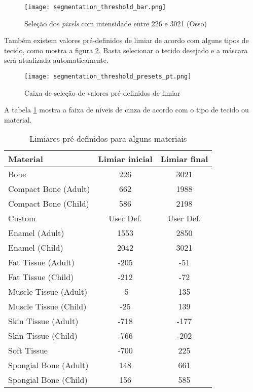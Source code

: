 \begin{figure}[!htb]
\centering
\texttt{[image: segmentation\_threshold\_bar.png]}
\caption{Seleção dos \textit{pixels} com intensidade entre 226 e 3021 (Osso)}
\label{fig:region_selection_bar}
\end{figure}

Também existem valores pré-definidos de limiar de acordo com alguns tipos de tecido, como mostra a
figura \ref{fig:limiar_presets}. Basta selecionar o tecido desejado e a máscara será atualizada
automaticamente.

\begin{figure}[!htb]
\centering
\texttt{[image: segmentation\_threshold\_presets\_pt.png]}
\caption{Caixa de seleção de valores pré-definidos de limiar}
\label{fig:limiar_presets}
\end{figure}

A tabela \ref{tab:limiar} mostra a faixa de níveis de cinza de acordo com o tipo de tecido ou material.

\begin{table}[h]
\centering
\caption{Limiares pré-definidos para alguns materiais}
\begin{tabular}{lcc}\\
\hline %
Material & Limiar inicial & Limiar final\\
\hline
\hline
Bone & 226 & 3021\\
Compact Bone (Adult) & 662 & 1988\\
Compact Bone (Child) & 586 & 2198\\
Custom & User Def. & User Def.\\
Enamel (Adult) & 1553 & 2850\\
Enamel (Child) & 2042 & 3021\\
Fat Tissue (Adult) & -205 & -51\\
Fat Tissue (Child) & -212 & -72\\
Muscle Tissue (Adult) & -5 & 135\\
Muscle Tissue (Child) & -25 & 139\\
Skin Tissue (Adult) & -718 & -177\\
Skin Tissue (Child) & -766 & -202\\
Soft Tissue & -700 & 225\\
Spongial Bone (Adult) & 148 & 661\\
Spongial Bone (Child) & 156 & 585\\
\hline
\end{tabular}
\label{tab:limiar}
\end{table} 
\newpage

